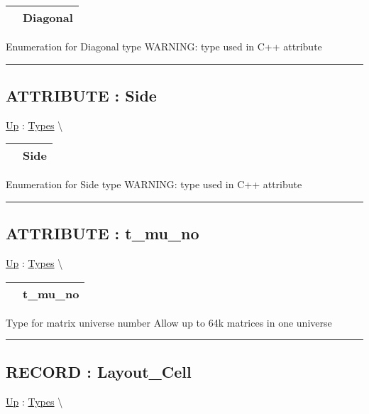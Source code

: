 {\renewcommand{\arraystretch}{1.5}
\begin{tabularx}{\textwidth}{|>{\raggedright\arraybackslash}l|X|}
\hline
\hspace{0pt} & Diagonal \\
\hline
\end{tabularx}
}

\par
Enumeration for Diagonal type WARNING: type used in C++ attribute


\rule{\linewidth}{0.5pt}
\subsection*{ATTRIBUTE : Side}
\hypertarget{ecldoc:ecldoc-Side}{}
\hyperlink{ecldoc:PBblas.Types}{Up} :
\hspace{0pt} \hyperlink{ecldoc:PBblas.Types}{Types} \textbackslash 

{\renewcommand{\arraystretch}{1.5}
\begin{tabularx}{\textwidth}{|>{\raggedright\arraybackslash}l|X|}
\hline
\hspace{0pt} & Side \\
\hline
\end{tabularx}
}

\par
Enumeration for Side type WARNING: type used in C++ attribute


\rule{\linewidth}{0.5pt}
\subsection*{ATTRIBUTE : t\_mu\_no}
\hypertarget{ecldoc:pbblas.types.t_mu_no}{}
\hyperlink{ecldoc:PBblas.Types}{Up} :
\hspace{0pt} \hyperlink{ecldoc:PBblas.Types}{Types} \textbackslash 

{\renewcommand{\arraystretch}{1.5}
\begin{tabularx}{\textwidth}{|>{\raggedright\arraybackslash}l|X|}
\hline
\hspace{0pt} & t\_mu\_no \\
\hline
\end{tabularx}
}

\par
Type for matrix universe number Allow up to 64k matrices in one universe


\rule{\linewidth}{0.5pt}
\subsection*{RECORD : Layout\_Cell}
\hypertarget{ecldoc:pbblas.types.layout_cell}{}
\hyperlink{ecldoc:PBblas.Types}{Up} :
\hspace{0pt} \hyperlink{ecldoc:PBblas.Types}{Types} \textbackslash 

